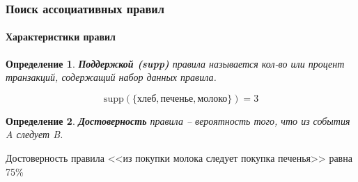 \documentclass[xcolor=table]{beamer}
\newtheorem{defn}{Определение}
\begin{document}
\begin{frame}
  \frametitle{Поиск ассоциативных правил}
  \framesubtitle{Характеристики правил}

  \begin{defn}
    \textbf{Поддержкой (supp)} правила называется кол-во или процент транзакций, содержащий набор данных правила.
  \end{defn}

  \[ \text{supp}(\{\text{хлеб}, \text{печенье}, \text{молоко}\}) = 3 \]

  \begin{defn}
    \textbf{Достоверность} правила -- вероятность того, что из события A следует B.
  \end{defn}

  \begin{center}
    Достоверность правила <<из покупки молока следует покупка печенья>> равна 75\%
  \end{center}
\end{frame}
\end{document}
